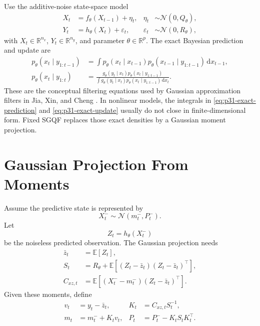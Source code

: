 \documentclass[11pt]{article}
\numberwithin{equation}{section}
\newcommand{\R}{\mathbb R}
\newcommand{\E}{\mathbb E}
\newcommand{\N}{\mathcal N}
\newcommand{\dd}{\,\mathrm d}
\begin{document}
Use the additive-noise state-space model
\begin{align}
  X_t &= f_\theta(X_{t-1})+\eta_t,
  &
  \eta_t&\sim\N(0,Q_\theta),
  \label{eq:p31-state-model}\\
  Y_t &= h_\theta(X_t)+\varepsilon_t,
  &
  \varepsilon_t&\sim\N(0,R_\theta),
  \label{eq:p31-observation-model}
\end{align}
with \(X_t\in\R^{n_x}\), \(Y_t\in\R^{n_y}\), and parameter \(\theta\in\R^p\).
The exact Bayesian prediction and update are
\begin{align}
  p_\theta(x_t\mid y_{1:t-1})
  &=
  \int p_\theta(x_t\mid x_{t-1})
       p_\theta(x_{t-1}\mid y_{1:t-1})\dd x_{t-1},
  \label{eq:p31-exact-prediction}\\
  p_\theta(x_t\mid y_{1:t})
  &=
  \frac{
  g_\theta(y_t\mid x_t)
  p_\theta(x_t\mid y_{1:t-1})}
  {\int g_\theta(y_t\mid x_t)
  p_\theta(x_t\mid y_{1:t-1})\dd x_t}.
  \label{eq:p31-exact-update}
\end{align}
These are the conceptual filtering equations used by Gaussian approximation
filters in Jia, Xin, and Cheng \cite[Section 2]{jia2012sparsegrid}.  In
nonlinear models, the integrals in \eqref{eq:p31-exact-prediction} and
\eqref{eq:p31-exact-update} usually do not close in finite-dimensional form.
Fixed SGQF replaces those exact densities by a Gaussian moment projection.

\section{Gaussian Projection From Moments}
\label{sec:p31-gaussian-projection}

Assume the predictive state is represented by
\begin{equation}
  X_t^-\sim\N(m_t^-,P_t^-).
  \label{eq:p31-predictive-gaussian}
\end{equation}
Let
\begin{equation}
  Z_t=h_\theta(X_t^-)
  \label{eq:p31-predicted-observation}
\end{equation}
be the noiseless predicted observation.  The Gaussian projection needs
\begin{align}
  \bar z_t &= \E[Z_t],
  \label{eq:p31-zbar}\\
  S_t &= R_\theta+\E[(Z_t-\bar z_t)(Z_t-\bar z_t)^\top],
  \label{eq:p31-S}\\
  C_{xz,t}&=\E[(X_t^- -m_t^-)(Z_t-\bar z_t)^\top].
  \label{eq:p31-Cxz}
\end{align}
Given these moments, define
\begin{align}
  v_t&=y_t-\bar z_t,
  &
  K_t&=C_{xz,t}S_t^{-1},
  \label{eq:p31-v-K}\\
  m_t&=m_t^-+K_tv_t,
  &
  P_t&=P_t^- - K_tS_tK_t^\top.
  \label{eq:p31-projection-update}
\end{align}
\end{document}
